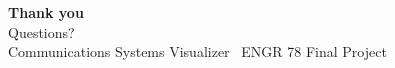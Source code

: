 \documentclass[aspectratio=169, 12pt]{beamer}
\begin{document}
\begin{frame}[plain]
\vspace{1.15cm}
\begin{center}
{\Huge\color{AccentBlue}\bfseries Thank you}\\[0.45cm]
{\Large Questions?}\\[0.75cm]
{\normalsize\color{SlideMuted}Communications Systems Visualizer \textbullet\ ENGR 78 Final Project}
\end{center}
\end{frame}
\end{document}
